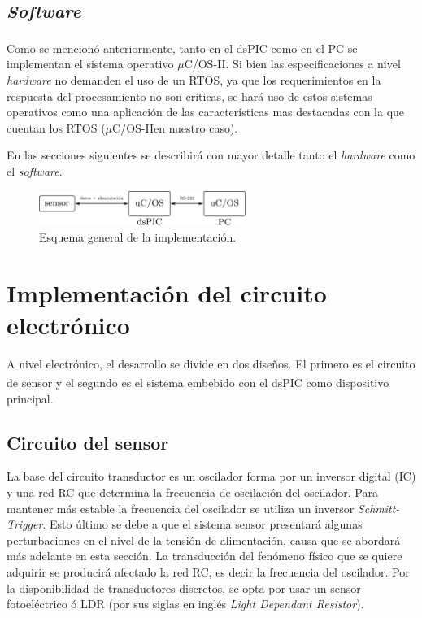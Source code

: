 \documentclass[11pt,a4paper,oneside]{article}
\def\uCOS{$\mu$C/OS-II\texttrademark}
\begin{document}
\subsection{\textsl{Software}}
\label{sec:esp-sw}

Como se mencionó anteriormente, tanto en el dsPIC\textsuperscript{\textregistered} como en el PC se implementan el sistema operativo \uCOS. Si bien las especificaciones a nivel \textsl{hardware} no demanden el uso de un RTOS, ya que los requerimientos en la respuesta del procesamiento no son críticas, se hará uso de estos sistemas operativos como una aplicación de las características mas destacadas con la que cuentan los RTOS (\uCOS en nuestro caso). 

En las secciones siguientes se describirá con mayor detalle tanto el \textsl{hardware} como el \textsl{software}. 


\begin{figure}[ht]
  \centering
  \includegraphics[width=0.6\textwidth]{images/hw-esquema-gral}  
  \caption{Esquema general de la implementación.}
  \label{fig:hw-esquema}
\end{figure}

\section{Implementación del circuito electrónico}
\label{sec:circ}

A nivel electrónico, el desarrollo se divide en dos diseños. El primero es el circuito de sensor y el segundo es el sistema embebido con el dsPIC\textsuperscript{\textregistered} como dispositivo principal.

\subsection{Circuito del sensor}
\label{sec:circ-sensor}

La base del circuito transductor es un oscilador forma por un inversor digital (IC) y una red RC que determina la frecuencia de oscilación del oscilador. Para mantener más estable la frecuencia del oscilador se utiliza un inversor \emph{Schmitt-Trigger}. Esto último se debe a que el sistema sensor presentará algunas perturbaciones en el nivel de la tensión de alimentación, causa que se abordará más adelante en esta sección. La transducción del fenómeno físico que se quiere adquirir se producirá afectado la red RC, es decir la frecuencia del oscilador. Por la disponibilidad de transductores discretos, se opta por usar un sensor fotoeléctrico ó LDR (por sus siglas en inglés \textsl{Light Dependant Resistor}). 
\end{document}
